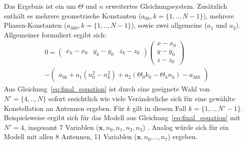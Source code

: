 {\begin{shaded}
\end{shaded}
%
Das Ergebnis ist ein um $\Theta$ und $n$ erweitertes Gleichungssystem. Zusätzlich enthält  es mehrere geometrische Konstanten ($a_{0k}, k=\{1,..,N-1\}$), mehrere Phasen-Konstanten ($a_{3k0}, k=\{1,..,N-1\}$), sowie zwei allgemeine ($a_1$ und $a_2$). Allgemeiner formuliert ergibt sich:
%
\begin{multline}\label{eq:final_equation}
0=
\left(
	\begin{array}{ccc}
		x_k-x_0 & y_k-y_0 & z_k-z_0 
	\end{array}
\right)
\left(
   \begin{array}{c}
	   x-x_0\\
	   y-y_0\\
	   z-z_0
   \end{array}
\right) \\
-
\left(
	\begin{array}{c}
		a_{0k}+a_1(n_0^2-n_k^2)+a_2(\Theta_0k_0-\Theta_kn_k)-a_{3k0}
	\end{array}
	\right)
\end{multline}
%
Aus Gleichung~\eqref{eq:final_equation} ist durch eine geeignete Wahl von $N'=\{4,..,N\}$ sofort ersichtlich wie viele Veränderliche sich für eine gewählte Konstellation an Antennen ergeben. Für $k$ gilt in diesem Fall $k=\{1,..,N'-1\}$.\\
%
Beispielsweise ergibt sich für das Modell aus Gleichung~\eqref{eq:final_equation} mit $N'=4$, insgesamt 7 Variablen ($\mathbf{x},n_0,n_1,n_2,n_3$) . Analog würde sich für ein Modell mit allen 8 Antennen, 11 Variablen ($\mathbf{x},n_0,..,n_7$) ergeben.
}